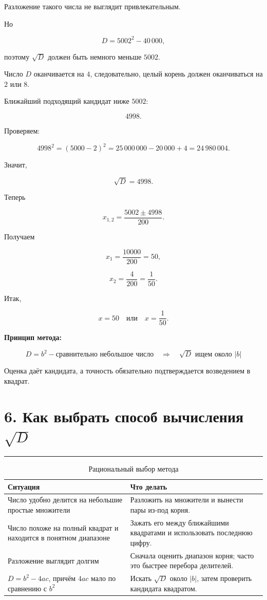 \documentclass[a4paper,12pt]{article}
\newcommand{\checksection}[1]{%
  \section*{\color{darkaccent}#1}
  \vspace{-0.6em}
  {\color{accent!70}\rule{\linewidth}{0.6pt}}
  \vspace{0.35em}
}
\newcommand{\keyidea}[1]{%
  \textcolor{darkaccent}{\textbf{#1}}
}
\begin{document}
Разложение такого числа не выглядит привлекательным.

Но

\[
D=5002^2-40\,000,
\]

поэтому \(\sqrt D\) должен быть немного меньше \(5002\).

Число \(D\) оканчивается на \(4\), следовательно, целый корень должен оканчиваться на \(2\) или \(8\).

Ближайший подходящий кандидат ниже \(5002\):

\[
4998.
\]

Проверяем:

\[
4998^2
=
(5000-2)^2
=
25\,000\,000-20\,000+4
=
24\,980\,004.
\]

Значит,

\[
\boxed{\sqrt D=4998}.
\]

Теперь

\[
x_{1,2}
=
\frac{5002\pm4998}{200}.
\]

Получаем

\[
x_1=\frac{10000}{200}=50,
\]

\[
x_2=\frac{4}{200}=\frac1{50}.
\]

Итак,

\[
\boxed{x=50\quad\text{или}\quad x=\frac1{50}}.
\]

\keyidea{Принцип метода:}

\[
\boxed{
D=b^2-\text{сравнительно небольшое число}
\quad\Longrightarrow\quad
\sqrt D\text{ ищем около }|b|
}
\]

Оценка даёт кандидата, а точность обязательно подтверждается возведением в квадрат.


\checksection{6. Как выбрать способ вычисления \(\sqrt D\)}

\begin{table}[ht]
\centering
\caption{Рациональный выбор метода}
\begin{tabularx}{\linewidth}{@{}p{4.2cm}X@{}}
\toprule
\textbf{Ситуация} & \textbf{Что делать} \\
\midrule
Число удобно делится на небольшие простые множители
&
Разложить на множители и вынести пары из-под корня.
\\
Число похоже на полный квадрат и находится в понятном диапазоне
&
Зажать его между ближайшими квадратами и использовать последнюю цифру.
\\
Разложение выглядит долгим
&
Сначала оценить диапазон корня; часто это быстрее перебора делителей.
\\
\(D=b^2-4ac\), причём \(4ac\) мало по сравнению с \(b^2\)
&
Искать \(\sqrt D\) около \(|b|\), затем проверить кандидата квадратом.
\\
\bottomrule
\end{tabularx}
\end{table}
\end{document}
